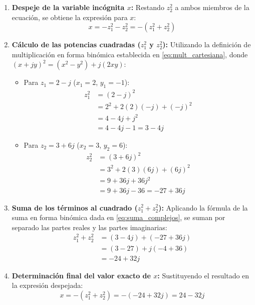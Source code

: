 \documentclass[11pt,a4paper]{article}
\begin{document}
\begin{enumerate}
    \item \textbf{Despeje de la variable incógnita $x$:}
    Restando $z_2^2$ a ambos miembros de la ecuación, se obtiene la expresión para $x$:
    \[
    x = -z_1^2 - z_2^2 = -\left(z_1^2 + z_2^2\right)
    \]

    \item \textbf{Cálculo de las potencias cuadradas ($z_1^2$ y $z_2^2$):}
    Utilizando la definición de multiplicación en forma binómica establecida en \eqref{eq:mult_cartesiana}, donde $(x + jy)^2 = (x^2 - y^2) + j(2xy)$:
    \begin{itemize}
        \item Para $z_1 = 2 - j$ ($x_1 = 2$, $y_1 = -1$):
        \begin{align*}
            z_1^2 &= (2 - j)^2 \\
            &= 2^2 + 2(2)(-j) + (-j)^2 \\
            &= 4 - 4j + j^2 \\
            &= 4 - 4j - 1 = 3 - 4j
        \end{align*}
        
        \item Para $z_2 = 3 + 6j$ ($x_2 = 3$, $y_2 = 6$):
        \begin{align*}
            z_2^2 &= (3 + 6j)^2 \\
            &= 3^2 + 2(3)(6j) + (6j)^2 \\
            &= 9 + 36j + 36j^2 \\
            &= 9 + 36j - 36 = -27 + 36j
        \end{align*}
    \end{itemize}

    \item \textbf{Suma de los términos al cuadrado ($z_1^2 + z_2^2$):}
    Aplicando la fórmula de la suma en forma binómica dada en \eqref{eq:suma_complejos}, se suman por separado las partes reales y las partes imaginarias:
    \begin{align*}
        z_1^2 + z_2^2 &= (3 - 4j) + (-27 + 36j) \\
        &= (3 - 27) + j(-4 + 36) \\
        &= -24 + 32j
    \end{align*}

    \item \textbf{Determinación final del valor exacto de $x$:}
    Sustituyendo el resultado en la expresión despejada:
    \[
    x = -(z_1^2 + z_2^2) = -(-24 + 32j) = 24 - 32j
    \]
\end{enumerate}
\end{document}
